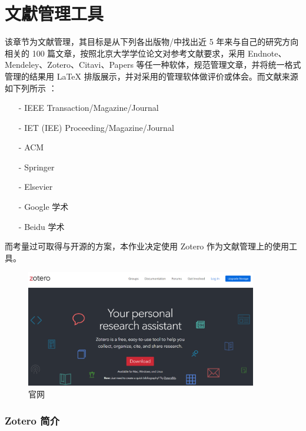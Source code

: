 \chapter{文獻管理工具}
\label{chap:2}

该章节为文献管理，其目标是从下列各出版物/中找出近 5 年来与自己的研究方向相关的 100 篇文章，按照北京大学学位论文对参考文献要求，采用 Endnote、Mendeley、Zotero、Citavi、Papers 等任一种软体，规范管理文章，并将统一格式管理的结果用 LaTeX 排版展示，并对采用的管理软体做评价或体会。而文献来源如下列所示 ：

\begin{itemize}

\item [-]IEEE Transaction/Magazine/Journal

\item [-]IET (IEE) Proceeding/Magazine/Journal

\item [-]ACM

\item [-]Springer

\item [-]Elsevier

\item [-]Google 学术

\item [-]Beidu 学术

\end{itemize}

而考量过可取得与开源的方案，本作业决定使用 Zotero 作为文献管理上的使用工具。

\begin{figure}[htb]
\centering 
\includegraphics[width=0.90\textwidth]{img/c2m0.png} 
\caption{官网}
\label{Test}
\end{figure}

\subsection{Zotero 简介}

